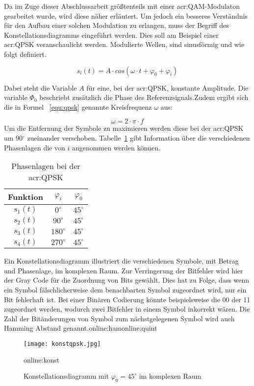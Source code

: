 Da im Zuge dieser Abschlussarbeit größtenteils mit einer \gls{acr:QAM}-Modulaton gearbeitet wurde, wird diese näher erläutert. Um jedoch ein besseres Verständnis für den Aufbau einer solchen Modulation zu erlangen, muss der Begriff des Konstellationsdiagramms eingeführt werden. Dies soll am Beispiel einer \gls{acr:QPSK} veranschaulicht werden. Modulierte Wellen, sind sinusförmig und wie folgt definiert. 

\begin{equation}
	\label{equ:qpsk}
	s_{i}(t) = A \cdot cos(\omega \cdot t+\varphi_{0}+\varphi_{i})
\end{equation}

Dabei steht die Variable $A$ für eine, bei der \gls{acr:QPSK}, konstante Amplitude. Die variable $\varPhi_{0}$ beschriebt zusätzlich die Phase des Referenzsignals.Zudem ergibt sich die in Formel ~\ref{equ:qpsk} genannte Kreisfrequenz $\omega$ aus:

\begin{equation}
	\label{equ:omega}
	\omega = 2 \cdot \pi \cdot f
\end{equation}
Um die Entfernung der Symbole zu maximieren werden diese bei der \gls{acr:QPSK} um 90$^\circ$ zueinander verschoben. Tabelle~\ref{tab:qpsk} gibt Information über die verschiedenen Phasenlagen die von $i$ angenommen werden können.
\begin{table}[htb]
\centering
		\begin{tabular}[h]{ccc}	
			\toprule
			Funktion & $\varphi_{i}$& $\varphi_{0}$ \\
			\midrule
			$s_{1}(t)$ & $0^\circ$ & $45^\circ$ \\
			$s_{2}(t)$ & $90^\circ$ & $45^\circ$\\
			$s_{3}(t)$ & $180^\circ$ & $45^\circ$\\
			$s_{4}(t)$ & $270^\circ$& $45^\circ$ \\
			\bottomrule
		\end{tabular}
		\caption{Phasenlagen bei der \gls{acr:QPSK}}
		\label{tab:qpsk}
\end{table}

Ein Konstellationsdiagramm illustriert die verschiedenen Symbole, mit Betrag und Phasenlage, im komplexen Raum. Zur Verringerung der Bitfehler wird hier der Gray Code für die Zuordnung von Bits gewählt. Dies hat zu Folge, dass wenn ein Symbol fälschlicherweise dem benachbarten Symbol zugeordnet wird, nur ein Bit fehlerhaft ist. Bei einer Binären Codierung könnte beispielsweise die 00 der 11 zugeordnet werden, wodurch zwei Bitfehler in einem Symbol inkorrekt wären. Die Zahl der Bitänderungen von Symbol zum nächstgelegenen Symbol wird auch Hamming Abstand genannt.\gls{online:ham}\gls{online:quint}
\begin{figure}[H]
	\centering
	\texttt{[image: konstqpsk.jpg]}
	\caption[Konstellationsdiagramm mit $\varphi_{0}=45^\circ$ im komplexen Raum]{Konstellationsdiagramm mit $\varphi_{0}=45^\circ$ im komplexen Raum} 
	\gls{online:konst}
	\label{fig:konstqpsk}
\end{figure}

